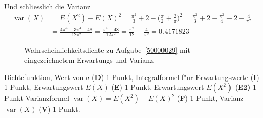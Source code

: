 \begin{loesung}
\begin{teilaufgaben}
Und schliesslich die Varianz
\begin{align*}
\operatorname{var}(X)
&=
E(X^2)-E(X)^2
=
\frac{\pi^2}3+2-\biggl(\frac{\pi}{2}+\frac{2}{\pi}\biggr)^2
=
\frac{\pi^2}3+2-\frac{\pi^2}{4}-2-\frac{4}{\pi^2}
\\
&=
\frac{4\pi^4-3\pi^4-48}{12\pi^2}
=
\frac{\pi^4-48}{12\pi^2}=\frac{\pi^2}{12}-\frac{4}{\pi^2}=0.4171823
\end{align*}
\end{teilaufgaben}
\begin{figure}
\centering
{}
\caption{Wahrscheinlichkeitsdichte zu Aufgabe~\ref{50000029} mit
eingezeichnetem Erwartungs und Varianz.
\label{50000029:phievar}}
\end{figure}
\end{loesung}


\begin{bewertung}
Dichtefunktion, Wert von $a$ ({\bf D}) 1 Punkt,
Integralformel f"ur Erwartungswerte ({\bf I}) 1 Punkt,
Erwartungswert $E(X)$ ({\bf E}) 1 Punkt,
Erwartungswert $E(X^2)$ ({\bf E2)} 1 Punkt
Varianzformel $\operatorname{var}(X)=E(X^2)-E(X)^2$ ({\bf F}) 1 Punkt,
Varianz $\operatorname{var}(X)$ ({\bf V}) 1 Punkt.
\end{bewertung}




